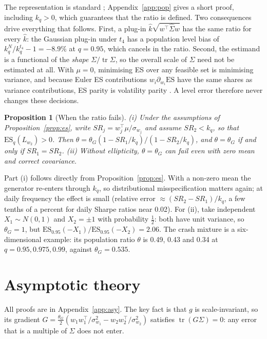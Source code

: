 \documentclass[11pt]{article}
\newcommand{\ES}{\mathrm{ES}}
\newcommand{\tr}{\operatorname{tr}}
\newtheorem{proposition}{Proposition}
\theoremstyle{remark}
\begin{document}
The representation is standard \citep[Ch.~6]{mcneil2015}; Appendix~\ref{app:pop} gives a short proof,
including $k_q>0$, which guarantees that the ratio is defined. Two consequences drive everything that follows.
First, a plug-in $\hat k\sqrt{w^\top\hat\Sigma w}$ has the same ratio for every $\hat k$: the Gaussian plug-in
under $t_4$ has a population level bias of $k^N_q/k^{t_4}_q-1=-8.9\%$ at $q=0.95$, which cancels in the ratio.
Second, the estimand is a functional of the \emph{shape} $\Sigma/\tr\Sigma$, so the overall scale of $\Sigma$
need not be estimated at all. With $\mu=0$, minimising ES over any feasible set is minimising variance, and
because Euler ES contributions $w_i\partial_{w_i}\ES$ have the same shares as variance contributions, ES
parity is volatility parity \citep{tasche1999}. A level error therefore never changes these decisions.

\begin{proposition}[When the ratio fails]\label{prop:bound}
(i) Under the assumptions of Proposition~\ref{prop:es}, write $SR_j=w_j^\top\mu/\sigma_{w_j}$ and assume $SR_2<k_q$, so that $\ES_q(L_{w_2})>0$. Then
$\theta=\theta_G(1-SR_1/k_q)/(1-SR_2/k_q)$, and $\theta=\theta_G$ if and only if $SR_1=SR_2$.
(ii) Without ellipticity, $\theta=\theta_G$ can fail even with zero mean and correct covariance.
\end{proposition}

Part (i) follows directly from Proposition~\ref{prop:es}. With a non-zero mean the generator re-enters
through $k_q$, so distributional misspecification matters again; at daily frequency the effect is small
(relative error $\approx(SR_2-SR_1)/k_q$, a few tenths of a percent for daily Sharpe ratios near 0.02). For
(ii), take independent $X_1\sim N(0,1)$ and $X_2=\pm1$ with probability $\frac12$: both have unit variance, so
$\theta_G=1$, but $\ES_{0.95}(-X_1)/\ES_{0.95}(-X_2)=2.06$. The crash mixture is a six-dimensional example:
its population ratio $\theta$ is 0.49, 0.43 and 0.34 at $q=0.95,0.975,0.99$, against $\theta_G=0.535$.

\section{Asymptotic theory}\label{sec:asy}

All proofs are in Appendix~\ref{app:asy}. The key fact is that $g$ is scale-invariant, so its gradient
$G=\frac{\theta_G}2(w_1w_1^\top/\sigma_{w_1}^2-w_2w_2^\top/\sigma_{w_2}^2)$ satisfies $\tr(G\Sigma)=0$: any error
that is a multiple of $\Sigma$ does not enter.
\end{document}
